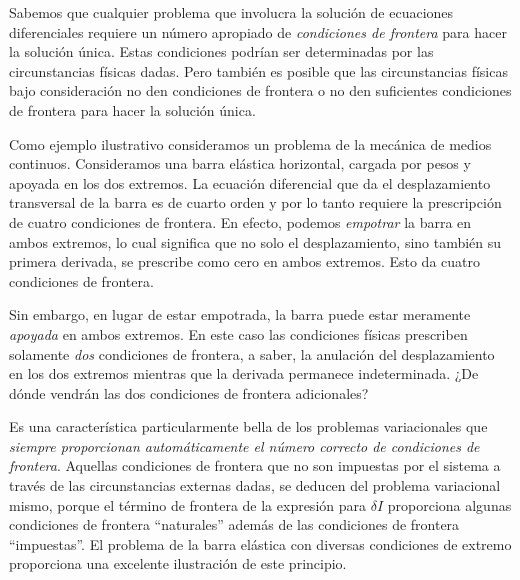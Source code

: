 \documentclass[12pt,a4paper]{book}
\begin{document}
Sabemos que cualquier problema que involucra la solución de ecuaciones diferenciales requiere un número apropiado de \textit{condiciones de frontera} para hacer la solución única. Estas condiciones podrían ser determinadas por las circunstancias físicas dadas. Pero también es posible que las circunstancias físicas bajo consideración no den condiciones de frontera o no den suficientes condiciones de frontera para hacer la solución única.

Como ejemplo ilustrativo consideramos un problema de la mecánica de medios continuos. Consideramos una barra elástica horizontal, cargada por pesos y apoyada en los dos extremos. La ecuación diferencial que da el desplazamiento transversal de la barra es de cuarto orden y por lo tanto requiere la prescripción de cuatro condiciones de frontera. En efecto, podemos \textit{empotrar} la barra en ambos extremos, lo cual significa que no solo el desplazamiento, sino también su primera derivada, se prescribe como cero en ambos extremos. Esto da cuatro condiciones de frontera.

Sin embargo, en lugar de estar empotrada, la barra puede estar meramente \textit{apoyada} en ambos extremos. En este caso las condiciones físicas prescriben solamente \textit{dos} condiciones de frontera, a saber, la anulación del desplazamiento en los dos extremos mientras que la derivada permanece indeterminada. ¿De dónde vendrán las dos condiciones de frontera adicionales?

Es una característica particularmente bella de los problemas variacionales que \textit{siempre proporcionan automáticamente el número correcto de condiciones de frontera}. Aquellas condiciones de frontera que no son impuestas por el sistema a través de las circunstancias externas dadas, se deducen del problema variacional mismo, porque el término de frontera de la expresión para $\delta I$ proporciona algunas condiciones de frontera ``naturales'' además de las condiciones de frontera ``impuestas''. El problema de la barra elástica con diversas condiciones de extremo proporciona una excelente ilustración de este principio.
\end{document}
